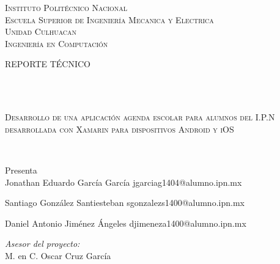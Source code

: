 \begin{center}
\vspace*{-1cm}			%

\textsc{\huge Instituto Polit\'ecnico Nacional}\\[1cm] 
\textsc{\LARGE Escuela Superior de Ingenier\'ia Mecanica y Electrica}\\[0.5cm] %
\textsc{\LARGE Unidad Culhuacan}\\[0.5cm] %
\textsc{\LARGE Ingenier\'ia en Computaci\'on }\\[1cm] %

\begin{minipage}{0.9\textwidth} 
\begin{center}																					%
\textsc{\LARGE REPORTE TÉCNICO}
\end{center}
\end{minipage}\\[0.5cm]
 			\vspace*{1cm}															%
\HRule \\[0.1cm]																	%
\begin{center} \textsc{\Large Desarrollo de una aplicación agenda escolar para alumnos del I.P.N desarrollada con Xamarin para dispositivos Android y iOS \\}
\end{center}
\HRule \\[0.1cm]%




   \vspace{0.8cm}
\begin{center}
{\large Presenta}\\                                                                %
Jonathan Eduardo García García\hspace{1cm} jgarciag1404@alumno.ipn.mx

Santiago González Santiesteban\hspace{1cm} sgonzalezs1400@alumno.ipn.mx

Daniel Antonio Jiménez Ángeles\hspace{1cm} djimeneza1400@alumno.ipn.mx
\vspace{1 cm}
\end{center}

\begin{center}
\begin{minipage}{1\textwidth}													    %
\begin{flushleft} \large														    %
\emph{Asesor del proyecto:}\\
\vspace{0.3cm}
M. en C. Oscar Cruz García\\
    \vspace*{1cm}	
\end{flushleft}	
\end{minipage}		                                            %
\end{center}


\end{center}
